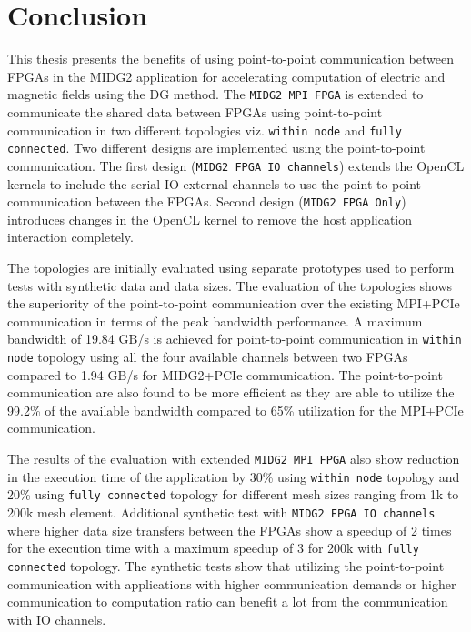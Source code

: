 \chapter{Conclusion}
\label{cha:Conclusion}

This thesis presents the benefits of using point-to-point communication between
FPGAs in the MIDG2 application for accelerating computation of electric and magnetic
fields using the \acl{DG} method. The \texttt{MIDG2 MPI FPGA} is extended to communicate
the shared data between FPGAs using point-to-point communication in two different
topologies viz. \texttt{within node} and \texttt{fully connected}. Two different
designs are implemented using the point-to-point communication. The first design
(\texttt{MIDG2 FPGA IO channels}) extends the OpenCL kernels to include the serial IO external channels to use
the point-to-point communication between the FPGAs. Second design (\texttt{MIDG2 FPGA Only})
introduces changes in the OpenCL kernel to remove the host application interaction completely.

The topologies are initially evaluated using separate prototypes used to perform
tests with synthetic data and data sizes. The evaluation of the topologies
shows the superiority of the point-to-point communication over the existing
MPI+PCIe communication in terms of the peak bandwidth performance. A maximum
bandwidth of 19.84 GB/s is achieved for point-to-point communication in
\texttt{within node} topology using all the four available channels between
two FPGAs compared to 1.94 GB/s for MIDG2+PCIe communication. The point-to-point
communication are also found to be more efficient as they are able to utilize the
99.2\% of the available bandwidth compared to 65\% utilization for the MPI+PCIe
communication.

The results of the evaluation with extended \texttt{MIDG2 MPI FPGA} also show
reduction in the execution time of the application by 30\% using \texttt{within node} topology
and 20\% using \texttt{fully connected} topology for different mesh sizes ranging
from 1k to 200k mesh element. Additional synthetic test with \texttt{MIDG2 FPGA IO channels}
where higher data size transfers between the FPGAs show a speedup of 2 times for the execution
time with a maximum speedup of 3 for 200k with \texttt{fully connected} topology. The synthetic tests
show that utilizing the point-to-point communication with applications with higher communication
demands or higher communication to computation ratio can benefit a lot from the communication with
IO channels.

